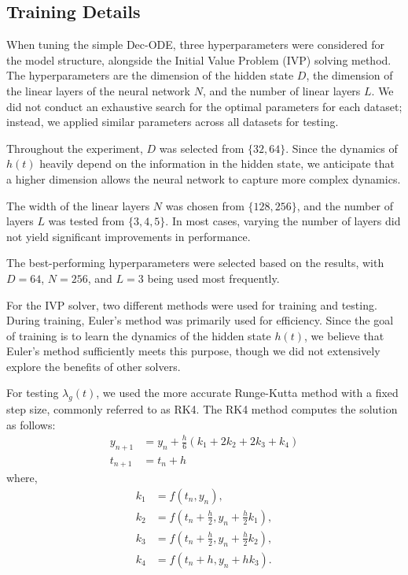 \subsection{Training Details}
When tuning the simple Dec-ODE, three hyperparameters were considered for the model structure, alongside the Initial Value Problem (IVP) solving method. The hyperparameters are the dimension of the hidden state $D$, the dimension of the linear layers of the neural network $N$, and the number of linear layers $L$. We did not conduct an exhaustive search for the optimal parameters for each dataset; instead, we applied similar parameters across all datasets for testing.

Throughout the experiment, $D$ was selected from $\{32, 64\}$. Since the dynamics of $h(t)$ heavily depend on the information in the hidden state, we anticipate that a higher dimension allows the neural network to capture more complex dynamics.

The width of the linear layers $N$ was chosen from $\{128, 256\}$, and the number of layers $L$ was tested from $\{3, 4, 5\}$. In most cases, varying the number of layers did not yield significant improvements in performance.

The best-performing hyperparameters were selected based on the results, with $D=64$, $N=256$, and $L=3$ being used most frequently.

For the IVP solver, two different methods were used for training and testing. During training, Euler's method was primarily used for efficiency. Since the goal of training is to learn the dynamics of the hidden state $h(t)$, we believe that Euler's method sufficiently meets this purpose, though we did not extensively explore the benefits of other solvers.

For testing $\lambda_g(t)$, we used the more accurate Runge-Kutta method with a fixed step size, commonly referred to as RK4. The RK4 method computes the solution as follows:
\begin{align}
    y_{n+1} &= y_n + \frac{h}{6}(k_1 + 2k_2 + 2k_3 + k_4) \\
    t_{n+1} &= t_n + h
\end{align}
where,
\begin{align}
k_1 &= f(t_n, y_n), \\
k_2 &= f(t_n + \frac{h}{2}, y_n + \frac{h}{2} k_1), \\
k_3 &= f(t_n + \frac{h}{2}, y_n + \frac{h}{2} k_2), \\
k_4 &= f(t_n + h, y_n + h k_3).
\end{align}

